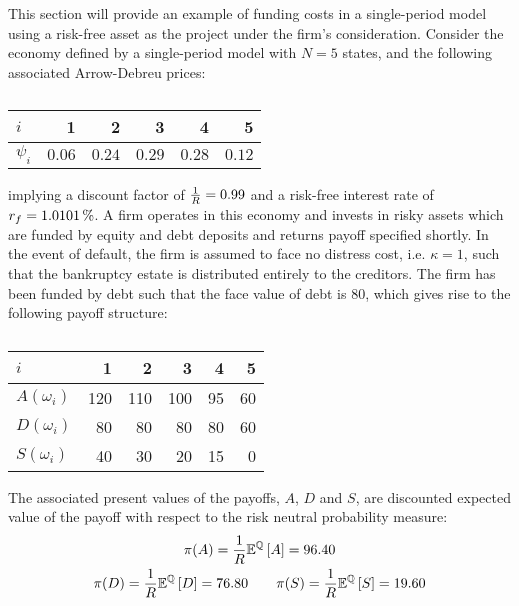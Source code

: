 \documentclass[main.tex]{subfiles}
\begin{document}
    This section will provide an example of funding costs in a single-period model
    using a risk-free asset as the project under the firm's consideration.
    Consider the economy defined by a single-period model with $N=5$ states, 
    and the following associated Arrow-Debreu prices:
        \begin{table}[H]
            \centering
            \begin{tabular}{l|rrrrr}
                $i$ & 1 & 2 & 3 & 4 & 5 \\
                \hline
                $\psi_{i}$ & $\num{0.06}$ & $\num{0.24}$ & $\num{0.29}$ & $\num{0.28}$ & $\num{0.12}$ \\
            \end{tabular}
            \caption{}
            \label{tbl:example-firm-structure}
        \end{table}
    implying a discount factor of $\frac{1}{R} = \num{0.99}$ and a risk-free interest rate of $\rfrate = \pct{0.010101}$.
    A firm operates in this economy and invests in risky assets 
    which are funded by equity and debt deposits and returns payoff specified shortly.
    In the event of default, the firm is assumed to face no distress cost, i.e. $\kappa = 1$, 
    such that the bankruptcy estate is distributed entirely to the creditors.
    The firm has been funded by debt such that the face value of debt is $\num{80}$, 
    which gives rise to the following payoff structure:
    \begin{table}[H]
        \centering
        \begin{tabular}{l|rrrrr}
            $i$ & 1 & 2 & 3 & 4 & 5 \\
            \hline
            $A(\omega_{i})$ & \num{120} & \num{110} & \num{100} & \num{95} & \num{60} \\
            $D(\omega_{i})$ & \num{80} & \num{80} & \num{80} & \num{80} & \num{60} \\
            $S(\omega_{i})$ & \num{40} & \num{30} & \num{20} & \num{15} & \num{0}
        \end{tabular}
        \caption{}
        \label{tbl:example-pre-project-capital-structure}
    \end{table}
    The associated present values of the payoffs, $A$, $D$ and $S$, 
    are discounted expected value of the payoff with respect to the risk neutral probability measure:
        \begin{gather*}
            \pi(A) = \frac{1}{R} \mathbb{E}^{\mathbb{Q}}\left[A\right] = \num{96.40} \\
            \pi(D) = \frac{1}{R} \mathbb{E}^{\mathbb{Q}}\left[D\right] = \num{76.80}
            \qquad \pi(S) = \frac{1}{R} \mathbb{E}^{\mathbb{Q}}\left[S\right] = \num{19.60}
        \end{gather*}
\end{document}
